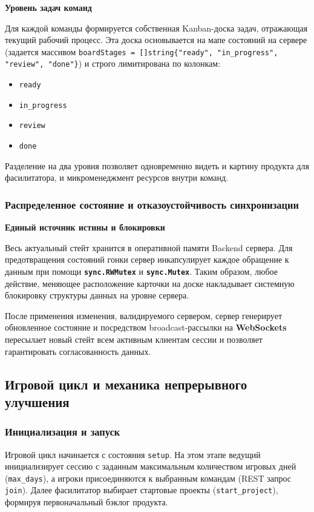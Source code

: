 \textbf{Уровень задач команд}

Для каждой команды формируется собственная Kanban-доска задач, отражающая текущий рабочий процесс. Эта доска основывается на мапе состояний на сервере (задается массивом \texttt{boardStages = []string\{"ready", "in\_progress", "review", "done"\}}) и строго лимитирована по колонкам:
\begin{itemize}
    \item \texttt{ready}
    \item \texttt{in\_progress} 
    \item \texttt{review} 
    \item \texttt{done} 
\end{itemize}
Разделение на два уровня позволяет одновременно видеть и картину продукта для фасилитатора, и микроменеджмент ресурсов внутри команд.

\subsubsection{Распределенное состояние и отказоустойчивость синхронизации}

\textbf{Единый источник истины и блокировки}

Весь актуальный стейт хранится в оперативной памяти Backend сервера. Для предотвращения состояний гонки сервер инкапсулирует каждое обращение к данным при помощи \textbf{\texttt{sync.RWMutex}} и \textbf{\texttt{sync.Mutex}}. Таким образом, любое действие, меняющее расположение карточки на доске накладывает системную блокировку структуры данных на уровне сервера. 

После применения изменения, валидируемого сервером, сервер генерирует обновленное состояние и посредством broadcast-рассылки на \textbf{WebSockets} пересылает новый стейт всем активным клиентам сессии и позволяет гарантировать согласованность данных.

\subsection{Игровой цикл и механика непрерывного улучшения}

\subsubsection{Инициализация и запуск}

Игровой цикл начинается с состояния \texttt{setup}. На этом этапе ведущий инициализирует сессию с заданным максимальным количеством игровых дней (\texttt{max\_days}), а игроки присоединяются к выбранным командам (REST запрос \texttt{join}). Далее фасилитатор выбирает стартовые проекты (\texttt{start\_project}), формируя первоначальный бэклог продукта.

